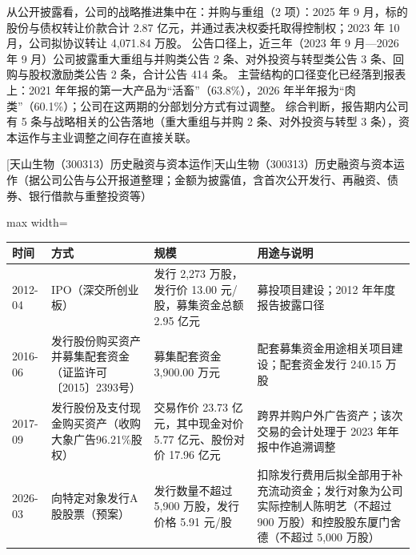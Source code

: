  从公开披露看，公司的战略推进集中在：并购与重组（2 项）：2025 年 9 月，标的股份与债权转让价款合计 2.87 亿元，并通过表决权委托取得控制权；2023 年 10 月，公司拟协议转让 4,071.84 万股。 公告口径上，近三年（2023 年 9 月---2026 年 9 月）公司披露重大重组与并购类公告 2 条、对外投资与转型类公告 3 条、回购与股权激励类公告 2 条，合计公告 414 条。 主营结构的口径变化已经落到报表上：2021 年年报的第一大产品为“活畜”（63.8\%），2026 年半年报为“肉类”（60.1\%）；公司在这两期的分部划分方式有过调整。 综合判断，报告期内公司有 5 条与战略相关的公告落地（重大重组与并购 2 条、对外投资与转型 3 条），资本运作与主业调整之间存在直接关联。

\begin{center}\small\setlength{\tabcolsep}{4pt}
[天山生物（300313）历史融资与资本运作]{天山生物（300313）历史融资与资本运作（据公司公告与公开报道整理；金额为披露值，含首次公开发行、再融资、债券、银行借款与重整投资等）}
\begin{adjustbox}{max width=\textwidth}
\begin{tabular}{@{}p{1.45cm}p{2.55cm}p{4.05cm}p{4.95cm}@{}}
\toprule
时间 & 方式 & 规模 & 用途与说明 \\
\midrule
2012-04 & IPO（深交所创业板） & 发行 2,\allowbreak{}273 万股，\allowbreak{}发行价 13.00 元/\allowbreak{}股，\allowbreak{}募集资金总额 2.95 亿元 & 募投项目建设；2012 年年度报告披露口径 \\
2016-06 & 发行股份购买资产并募集配套资金（证监许可〔2015〕2393号） & 募集配套资金 3,\allowbreak{}900.00 万元 & 配套募集资金用途相关项目建设；配套资金发行 240.15 万股 \\
2017-09 & 发行股份及支付现金购买资产（收购大象广告96.21\%股权） & 交易作价 23.73 亿元，\allowbreak{}其中现金对价 5.77 亿元、\allowbreak{}股份对价 17.96 亿元 & 跨界并购户外广告资产；该次交易的会计处理于 2023 年年报中作追溯调整 \\
2026-03 & 向特定对象发行A股股票（预案） & 发行数量不超过 5,\allowbreak{}900 万股，\allowbreak{}发行价格 5.91 元/\allowbreak{}股 & 扣除发行费用后拟全部用于补充流动资金；发行对象为公司实际控制人陈明艺（不超过 900 万股）和控股股东厦门舍德（不超过 5,\allowbreak{}000 万股） \\
\bottomrule
\end{tabular}
\end{adjustbox}
\end{center}

